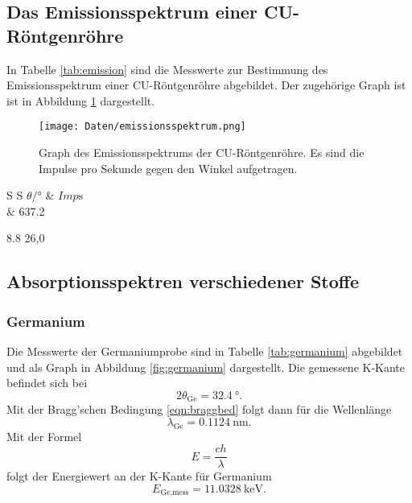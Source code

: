\subsection{Das Emissionsspektrum einer CU-Röntgenröhre}

In Tabelle \ref{tab:emission} sind die Messwerte zur Bestimmung des
Emissionsspektrum einer CU-Röntgenröhre abgebildet. Der zugehörige Graph ist
ist in Abbildung \ref{fig:emission} dargestellt.

\begin{figure}
  \centering
  \texttt{[image: Daten/emissionsspektrum.png]}
  \caption{Graph des Emissionsspektrums der CU-Röntgenröhre. Es sind die
  Impulse pro Sekunde gegen den Winkel aufgetragen.}
  \label{fig:emission}
\end{figure}

\begin{table}[h]
  \centering
  \begin{tabular}{S S}
    \toprule
    {$\theta/\si{\degree}$} & {$Imp\si{\second}$}\\
     & 637.2\\
    \bottomrule
  \end{tabular}
  \caption{Messwerte zur Bestimmung des Emissionsspektrums. Es sind die
  Impulse pro Sekunde gegen den Winkel aufgetragen.}
  \label{tab:emission}
\end{table}

8.8	26,0

\subsection{Absorptionsspektren verschiedener Stoffe}

\subsubsection{Germanium}

Die Messwerte der Germaniumprobe sind in Tabelle \ref{tab:germanium} abgebildet
und als Graph in Abbildung \ref{fig:germanium} dargestellt.
Die gemessene K-Kante befindet sich bei
\begin{equation}
  2\theta_\text{Ge} = \SI{32.4}{\degree}.
\end{equation}
Mit der Bragg'schen Bedingung \eqref{eqn:braggbed} folgt dann für die
Wellenlänge
\begin{equation}
  \lambda_\text{Ge} = \SI{0.1124}{\nano\meter}.
\end{equation}
Mit der Formel
\begin{equation}
  E = \frac{c h}{\lambda}
  \label{eqn:energielambda}
\end{equation}
folgt der Energiewert an der K-Kante für Germanium
\begin{equation}
  E_\text{Ge,mess} = \SI{11.0328}{\kilo\electronvolt}.
\end{equation}

